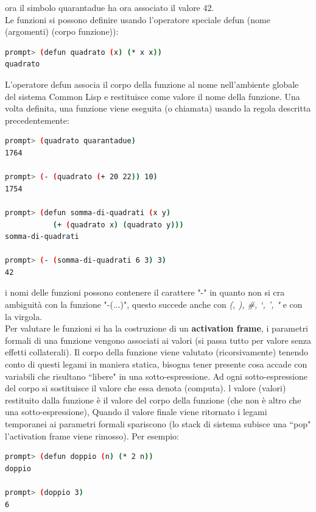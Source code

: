 \documentclass[a4paper,12pt, oneside]{book}
\begin{document}
ora il simbolo quarantadue ha ora associato il valore 42.\\
Le funzioni si possono definire usando l’operatore speciale defun (nome (argomenti) (corpo funzione)):
\begin{shaded}
\begin{lstlisting}[language=bash]
prompt> (defun quadrato (x) (* x x))
quadrato
\end{lstlisting}
\end{shaded}
L'operatore defun associa il corpo della funzione al nome
nell’ambiente globale del sistema Common Lisp e restituisce come valore il nome della funzione. Una volta definita, una funzione viene eseguita (o chiamata) usando la regola descritta precedentemente:
\begin{shaded}
\begin{lstlisting}[language=bash]
prompt> (quadrato quarantadue)
1764

prompt> (- (quadrato (+ 20 22)) 10)
1754

prompt> (defun somma-di-quadrati (x y)
           (+ (quadrato x) (quadrato y)))
somma-di-quadrati

prompt> (- (somma-di-quadrati 6 3) 3)
42
\end{lstlisting}
\end{shaded}
i nomi delle funzioni possono contenere il carattere "-" in quanto non si cra ambiguità con la funzione "-(...)", questo succede anche con \textit{(, ), \#, ‘, ’, "} e con la virgola.\\
Per valutare le funzioni si ha la costruzione di un \textbf{activation frame}, i parametri formali di una funzione vengono associati ai valori (si passa tutto per valore senza effetti collaterali). Il corpo della funzione viene valutato (ricorsivamente) tenendo conto di questi legami in maniera statica, bisogna tener presente cosa accade con variabili che risultano
“libere" in una sotto-espressione. Ad ogni sotto-espressione del corpo si sostituisce il valore che essa denota (computa). l valore (valori) restituito dalla funzione è il valore del corpo della funzione (che non è altro che una sotto-espressione), Quando il valore finale viene ritornato i legami temporanei ai parametri formali spariscono (lo stack di sistema subisce una “pop" l’activation frame viene rimosso). Per esempio:
\begin{shaded}
\begin{lstlisting}[language=bash]
prompt> (defun doppio (n) (* 2 n))
doppio

prompt> (doppio 3)
6
\end{lstlisting}
\end{shaded}
\end{document}
